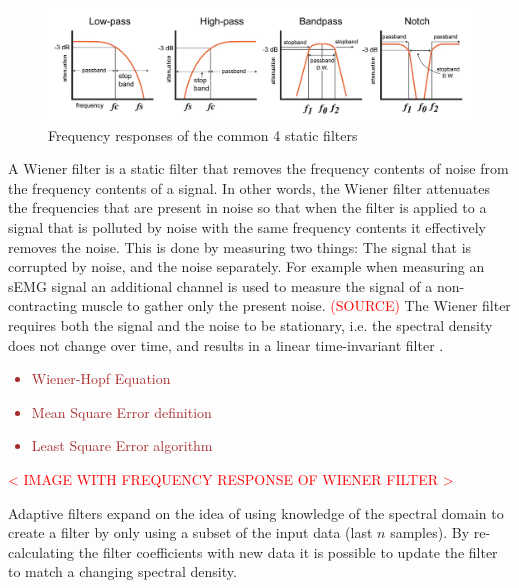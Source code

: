 \begin{figure}[h!t]
	\begin{center}
		\includegraphics[width=1.0\columnwidth]{images/Davis_intro_to_filters_filter_types.png}
	\end{center}
	\caption{Frequency responses of the common 4 static filters \cite{intro_to_static_filters}}
	\label{fig:static_filters}
\end{figure}

A Wiener filter is a static filter that removes the frequency contents of noise from the frequency contents of a signal. In other words, the Wiener filter attenuates the frequencies that are present in noise so that when the filter is applied to a signal that is polluted by noise with the same frequency contents it effectively removes the noise. This is done by measuring two things: The signal that is corrupted by noise, and the noise separately. For example when measuring an sEMG signal an additional channel is used to measure the signal of a non-contracting muscle to gather only the present noise. \textcolor{red}{(SOURCE)}
The Wiener filter requires both the signal and the noise to be stationary, i.e. the spectral density does not change over time, and results in a linear time-invariant filter \cite{wiki:Stationary_process} \cite{difference_stationary_nonstationary}.

\textcolor{brown}{\begin{itemize}
    \item Wiener-Hopf Equation
    \item Mean Square Error definition
    \item Least Square Error algorithm
\end{itemize}}

\textcolor{red}{< IMAGE WITH FREQUENCY RESPONSE OF WIENER FILTER > }

Adaptive filters expand on the idea of using knowledge of the spectral domain to create a filter by only using a subset of the input data (last $n$ samples). By re-calculating the filter coefficients with new data it is possible to update the filter to match a changing spectral density. 

